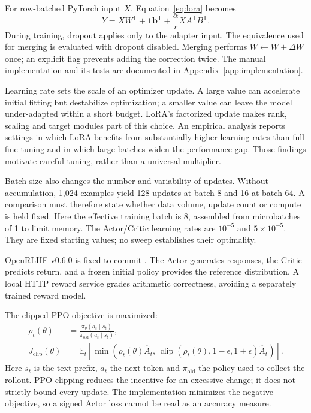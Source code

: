 For row-batched PyTorch input $X$, Equation~\eqref{eq:lora} becomes
\begin{equation}
Y=XW^{\mathsf T}+\boldsymbol{1}\boldsymbol{b}^{\mathsf T}
+\frac{\alpha}{r}XA^{\mathsf T}B^{\mathsf T}.
\end{equation}
During training, dropout applies only to the adapter input. The equivalence used for merging is evaluated with dropout disabled. Merging performs $W\leftarrow W+\Delta W$ once; an explicit flag prevents adding the correction twice. The manual implementation and its tests are documented in Appendix~\ref{app:implementation}.

Learning rate sets the scale of an optimizer update. A large value can accelerate initial fitting but destabilize optimization; a smaller value can leave the model under-adapted within a short budget. LoRA's factorized update makes rank, scaling and target modules part of this choice. An empirical analysis reports settings in which LoRA benefits from substantially higher learning rates than full fine-tuning and in which large batches widen the performance gap.\cite{lorablog} Those findings motivate careful tuning, rather than a universal multiplier.

Batch size also changes the number and variability of updates. Without accumulation, 1,024 examples yield 128 updates at batch 8 and 16 at batch 64. A comparison must therefore state whether data volume, update count or compute is held fixed. Here the effective training batch is 8, assembled from microbatches of 1 to limit memory. The Actor/Critic learning rates are $10^{-5}$ and $5\times10^{-5}$. They are fixed starting values; no sweep establishes their optimality.

OpenRLHF v0.6.0 is fixed to commit .\cite{openrlhf} The Actor generates responses, the Critic predicts return, and a frozen initial policy provides the reference distribution. A local HTTP reward service grades arithmetic correctness, avoiding a separately trained reward model.

The clipped PPO objective is maximized:\cite{ppo}
\begin{align}
\rho_t(\theta)&=
\frac{\pi_{\theta}(a_t\mid s_t)}{\pi_{\mathrm{old}}(a_t\mid s_t)},\\
J_{\mathrm{clip}}(\theta)&=
\mathbb{E}_t\!\left[
\min\left(\rho_t(\theta)\widehat A_t,\,
\operatorname{clip}(\rho_t(\theta),1-\epsilon,1+\epsilon)\widehat A_t\right)
\right].\label{eq:ppo}
\end{align}
Here $s_t$ is the text prefix, $a_t$ the next token and $\pi_{\mathrm{old}}$ the policy used to collect the rollout. PPO clipping reduces the incentive for an excessive change; it does not strictly bound every update. The implementation minimizes the negative objective, so a signed Actor loss cannot be read as an accuracy measure.

